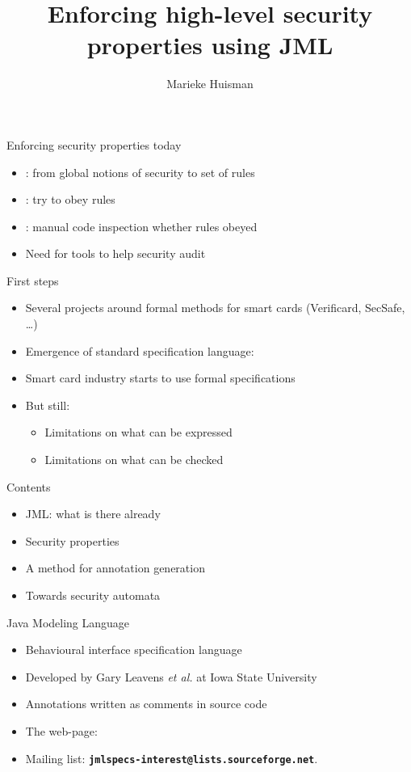 \documentclass[final,nocolorBG,a4,marieke,nototal,pdf, accumulate,slideColor]{prosper}
\title{Enforcing high-level security properties using JML}
\subtitle{}
\author{Marieke Huisman}
\newcommand{\textttbf}[1]{\texttt{\textbf{#1}}}
\begin{document}
 

\maketitle

\begin{slide}{Enforcing security properties today}
\begin{itemize}
\item {}: from global notions of security to set
of rules
\item {}: try to obey rules
\item {}: manual code inspection whether rules
obeyed
\item Need for tools to help security audit
\end{itemize}
\end{slide}

\begin{slide}{First steps}
\begin{itemize}
\item Several projects around formal methods for smart cards
(Verificard, SecSafe, \ldots)
\item Emergence of standard specification language: 
\item Smart card industry starts to use formal specifications
\item But still: 
\begin{itemize}
\item Limitations on what can be expressed
\item Limitations on what can be checked 
\end{itemize}
\end{itemize}
\end{slide}


\begin{slide}{Contents}
\begin{itemize}
\item JML: what is there already
\item Security properties
\item A method for annotation generation
\item Towards security automata
\end{itemize}
\end{slide}

\begin{slide}{Java Modeling Language}
\begin{itemize}
\item Behavioural interface specification language
\item Developed by Gary Leavens \emph{et al.} at Iowa State University
\item Annotations written as comments in source code
\item The web-page: \Blue{\textttbf{\textbf{http://www.jmlspecs.org}}}
\item Mailing list: \textttbf{jmlspecs-interest@lists.sourceforge.net}.
\end{itemize}
\end{slide}
\end{document}
